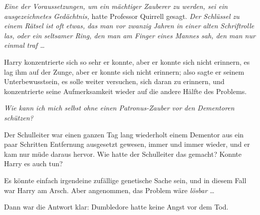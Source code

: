 \emph{Eine der Voraussetzungen, um ein mächtiger Zauberer zu werden, sei ein ausgezeichnetes Gedächtnis,} hatte Professor Quirrell gesagt. \emph{Der Schlüssel zu einem Rätsel ist oft etwas, das man vor zwanzig Jahren in einer alten Schriftrolle las, oder ein seltsamer Ring, den man am Finger eines Mannes sah, den man nur einmal traf …}

Harry konzentrierte sich so sehr er konnte, aber er konnte sich nicht erinnern, es lag ihm auf der Zunge, aber er konnte sich nicht erinnern; also sagte er seinem Unterbewusstsein, es solle weiter versuchen, sich daran zu erinnern, und konzentrierte seine Aufmerksamkeit wieder auf die andere Hälfte des Problems.

\emph{Wie kann ich mich selbst ohne einen Patronus-Zauber vor den Dementoren schützen?}

Der Schulleiter war einen ganzen Tag lang wiederholt einem Dementor aus ein paar Schritten Entfernung ausgesetzt gewesen, immer und immer wieder, und er kam nur müde daraus hervor. Wie hatte der Schulleiter das gemacht? Konnte Harry es auch tun?

Es könnte einfach irgendeine zufällige genetische Sache sein, und in diesem Fall war Harry am Arsch. Aber angenommen, das Problem wäre \emph{lösbar} …

Dann war die Antwort klar: Dumbledore hatte keine Angst vor dem Tod.

